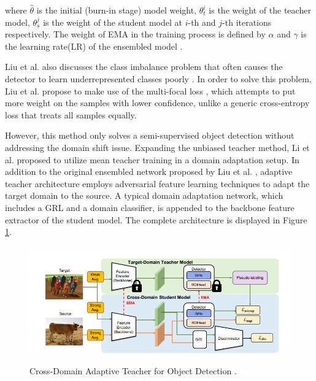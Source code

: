 where $\hat{\theta}$ is the initial (burn-in stage) model weight, $\theta_{t}^{i}$ is the weight of the teacher model, $\theta_{s}^{j}$ is the weight of the student model  at $i$-th and $j$-th iterations respectively. The weight of EMA in the training process is defined by $\alpha$ and $\gamma$ is the learning rate(LR) of the ensembled model \cite{Liu2021}.

Liu et al. also discusses the class imbalance problem that often causes the detector to learn underrepresented classes poorly \cite{Liu2021}. In order to solve this problem, Liu et al. propose to make use of the multi-focal loss \cite{Lin2017}, which attempts to put more weight on the samples with lower confidence, unlike a generic cross-entropy loss that treats all samples equally. 

However, this method only solves a semi-supervised object detection without addressing the domain shift issue. Expanding the unbiased teacher method, Li et al. \cite{Li2021} proposed to utilize mean teacher training in a domain adaptation setup. In addition to the original ensembled network proposed by Liu et al.  \cite{Liu2021}, adaptive teacher architecture employs adversarial feature learning techniques to adapt the target domain to the source. A typical domain adaptation network, which includes a GRL and a domain classifier, is appended to the backbone feature extractor of the student model. The complete architecture is displayed in Figure \ref{adapt_teacher}. 
 
\begin{figure}[htb]
	\begin{center}
		\includegraphics[width=16cm]{./adapt_teacher.png}
	\end{center}
	\caption{Cross-Domain Adaptive Teacher for Object Detection
\cite{Li2021}.}
	\begin{center}
		\label{adapt_teacher}
	\end{center}
\end{figure}
\FloatBarrier

